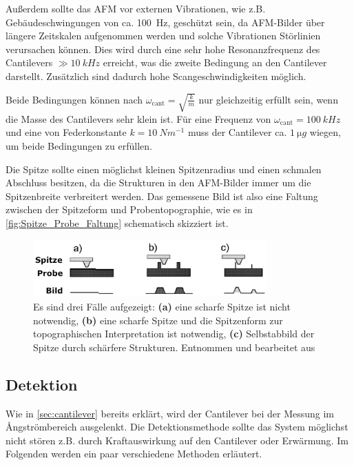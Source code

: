    Außerdem sollte das AFM vor externen Vibrationen, wie z.B. Gebäudeschwingungen von ca. \SI{100}{Hz}, geschützt sein, da AFM-Bilder über längere Zeitskalen aufgenommen werden und solche Vibrationen Störlinien verursachen können.
    Dies wird durch eine sehr hohe Resonanzfrequenz des Cantilevers $\gg \SI{10}{kHz}$ erreicht, was die zweite Bedingung an den Cantilever darstellt.
    Zusätzlich sind dadurch hohe Scangeschwindigkeiten möglich.
    
    Beide Bedingungen können nach $\omega_{\mathrm{cant}} = \sqrt{\frac{k}{m}}$ nur gleichzeitig erfüllt sein, wenn die Masse des Cantilevers sehr klein ist.
    Für eine Frequenz von $\omega_{\mathrm{cant}} = \SI{100}{kHz}$ und eine von Federkonstante $k = \SI{10}{Nm^{-1}}$ muss der Cantilever ca. $\SI{1}{\micro g}$ wiegen, um beide Bedingungen zu erfüllen.

    Die Spitze sollte einen möglichst kleinen Spitzenradius und einen schmalen Abschluss besitzen, da die Strukturen in den AFM-Bilder immer um die Spitzenbreite verbreitert werden.
    Das gemessene Bild ist also eine Faltung zwischen der Spitzeform und Probentopographie, wie es in \autoref{fig:Spitze_Probe_Faltung} schematisch skizziert ist.
    \begin{figure}[ht]
        \centering\captionsetup{format=plain}
        \includegraphics[width=0.8\textwidth]{bilder/Spitze_Probe_Faltung.png}
        \caption{Es sind drei Fälle aufgezeigt: \textbf{(a)} eine scharfe Spitze ist nicht notwendig, \textbf{(b)} eine scharfe Spitze und die Spitzenform zur topographischen Interpretation ist notwendig, \textbf{(c)} Selbstabbild der Spitze durch schärfere Strukturen. Entnommen und bearbeitet aus \cite{AFM_image_artifacts}}
        \label{fig:Spitze_Probe_Faltung}
    \end{figure}

\subsection{Detektion}
\label{sec:detektion}
    Wie in \autoref{sec:cantilever} bereits erklärt, wird der Cantilever bei der Messung im \r{A}ngströmbereich ausgelenkt.
    Die Detektionsmethode sollte das System möglichst nicht stören z.B. durch Kraftauswirkung auf den Cantilever oder Erwärmung.
    Im Folgenden werden ein paar verschiedene Methoden erläutert.

